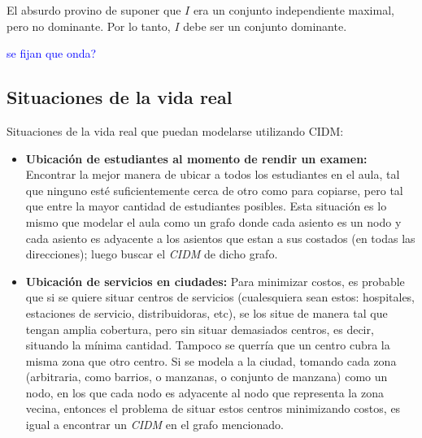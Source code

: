 El absurdo provino de suponer que $I$ era un conjunto independiente maximal, pero no dominante. Por lo tanto, $I$ debe ser un conjunto dominante.










\textcolor{blue}{se fijan que onda?}

\subsection{Situaciones de la vida real}

Situaciones de la vida real que puedan modelarse utilizando CIDM:

\begin{itemize}
	\item \textbf{Ubicación de estudiantes al momento de rendir un examen:} Encontrar la mejor manera de ubicar a todos los estudiantes en el aula, tal que ninguno esté suficientemente cerca de otro como para copiarse, pero tal que entre la mayor cantidad de estudiantes posibles. Esta situación es lo mismo que modelar el aula como un grafo donde cada asiento es un nodo y cada asiento es adyacente a los asientos que estan a sus costados (en todas las direcciones); luego buscar el \emph{CIDM} de dicho grafo.
	
	\item \textbf{Ubicación de servicios en ciudades:} Para minimizar costos, es probable que si se quiere situar centros de servicios (cualesquiera sean estos: hospitales, estaciones de servicio, distribuidoras, etc), se los situe de manera tal que tengan amplia cobertura, pero sin situar demasiados centros, es decir, situando la mínima cantidad. Tampoco se querría que un centro cubra la misma zona que otro centro. Si se modela a la ciudad, tomando cada zona (arbitraria, como barrios, o manzanas, o conjunto de manzana) como un nodo, en los que cada nodo es adyacente al nodo que representa la zona vecina, entonces el problema de situar estos centros minimizando costos, es igual a encontrar un \emph{CIDM} en el grafo mencionado.
\end{itemize}
